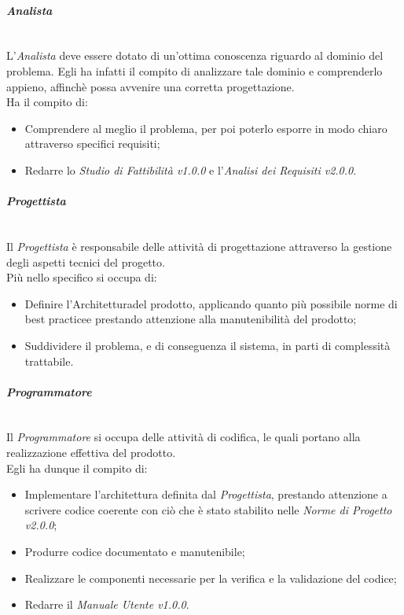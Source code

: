 \paragraph{\textit{Analista}} ~\\
	L'\textit{Analista} deve essere dotato di un'ottima conoscenza riguardo al dominio del problema. Egli ha infatti il 					compito di analizzare tale dominio e comprenderlo appieno, affinchè possa avvenire una corretta 											progettazione\glossario.\\
	Ha il compito di:
	\begin{itemize}
	\item Comprendere al meglio il problema, per poi poterlo esporre in modo chiaro attraverso specifici 									requisiti\glossario;
	\item Redarre lo \textit{Studio di Fattibilità v1.0.0} e l'\textit{Analisi dei Requisiti v2.0.0}.
	\end{itemize}

\paragraph{\textit{Progettista}} ~\\
	Il \textit{Progettista} è responsabile delle attività di progettazione attraverso la gestione degli aspetti tecnici 	del progetto.\\
	Più nello specifico si occupa di:
	\begin{itemize}
	\item Definire l'Architettura\glossario del prodotto\glossario, applicando quanto più possibile norme di 							best practice\glossario e prestando attenzione alla manutenibilità del prodotto;
	\item Suddividere il problema, e di conseguenza il sistema, in parti di complessità trattabile.
	\end{itemize}

\paragraph{\textit{Programmatore}} ~\\
	Il \textit{Programmatore} si occupa delle attività di codifica, le quali portano alla realizzazione effettiva del 						prodotto.\\
	Egli ha dunque il compito di:
	\begin{itemize}
	\item Implementare l'architettura definita dal \textit{Progettista}, prestando attenzione a scrivere codice 						coerente con ciò che è stato stabilito nelle \textit{Norme di Progetto v2.0.0};
	\item Produrre codice documentato e manutenibile;
	\item Realizzare le componenti necessarie per la verifica e la validazione del codice;
	\item Redarre il \textit{Manuale Utente v1.0.0}.
	\end{itemize}

